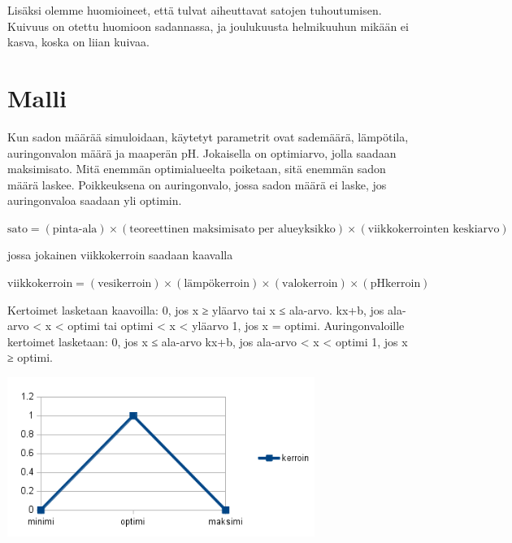 \documentclass[12pt]{scrreprt}
\begin{document}
Lisäksi olemme huomioineet, että tulvat aiheuttavat satojen tuhoutumisen. Kuivuus on otettu huomioon sadannassa, ja joulukuusta helmikuuhun mikään ei kasva, koska on liian kuivaa.
  
  \section{Malli}

  Kun sadon määrää simuloidaan, käytetyt parametrit ovat sademäärä, lämpötila, auringonvalon määrä ja maaperän pH. Jokaisella on optimiarvo, jolla saadaan maksimisato. Mitä enemmän optimialueelta poiketaan, sitä enemmän sadon määrä laskee. Poikkeuksena on auringonvalo, jossa sadon määrä ei laske, jos auringonvaloa saadaan yli optimin.

  \begin{em}
  $ \text{sato} = (\text{pinta-ala}) \times (\text{teoreettinen maksimisato per
  alueyksikko}) \times (\text{viikkokerrointen keskiarvo}) $\end{em}
  jossa jokainen viikkokerroin saadaan kaavalla

  \begin{em}
  $ \text{viikkokerroin} = (\text{vesikerroin}) \times (\text{lämpökerroin})
  \times (\text{valokerroin}) \times (\text{pHkerroin}) $\end{em}
  
  Kertoimet lasketaan kaavoilla:
  0, jos x ≥  yläarvo tai x ≤ ala-arvo.
  kx+b, jos ala-arvo < x < optimi tai optimi < x < yläarvo
  1, jos x = optimi.
  Auringonvaloille kertoimet lasketaan:
  0, jos x ≤ ala-arvo
  kx+b, jos ala-arvo < x < optimi
  1, jos x ≥ optimi.
  
  \includegraphics[width=10cm]{coefficientgraph.png}



\end{document}
